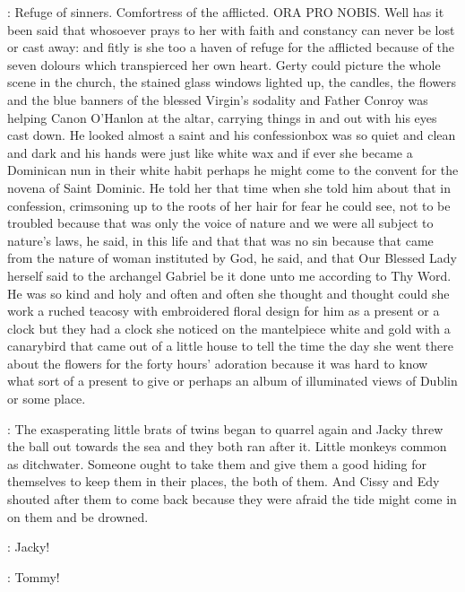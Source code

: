 :
Refuge of sinners. Comfortress of the afflicted. ORA PRO NOBIS. Well
has it been said that whosoever prays to her with faith and constancy can
never be lost or cast away: and fitly is she too a haven of refuge for the
afflicted because of the seven dolours which transpierced her own heart.
Gerty could picture the whole scene in the church, the stained glass
windows lighted up, the candles, the flowers and the blue banners of the
blessed Virgin's sodality and Father Conroy was helping Canon O'Hanlon at
the altar, carrying things in and out with his eyes cast down. He looked
almost a saint and his confessionbox was so quiet and clean and dark and
his hands were just like white wax and if ever she became a Dominican nun
in their white habit perhaps he might come to the convent for the novena
of Saint Dominic. He told her that time when she told him about that in
confession, crimsoning up to the roots of her hair for fear he could see,
not to be troubled because that was only the voice of nature and we were
all subject to nature's laws, he said, in this life and that that was no
sin because that came from the nature of woman instituted by God, he said,
and that Our Blessed Lady herself said to the archangel Gabriel be it done
unto me according to Thy Word. He was so kind and holy and often and often
she thought and thought could she work a ruched teacosy with embroidered
floral design for him as a present or a clock but they had a clock she
noticed on the mantelpiece white and gold with a canarybird that came out
of a little house to tell the time the day she went there about the
flowers for the forty hours' adoration because it was hard to know what
sort of a present to give or perhaps an album of illuminated views of
Dublin or some place.

:
The exasperating little brats of twins began to quarrel again and Jacky
threw the ball out towards the sea and they both ran after it. Little
monkeys common as ditchwater. Someone ought to take them and give them
a good hiding for themselves to keep them in their places, the both of
them. And Cissy and Edy shouted after them to come back because they
were afraid the tide might come in on them and be drowned.

\cissy:
Jacky!

\edy:
Tommy!

